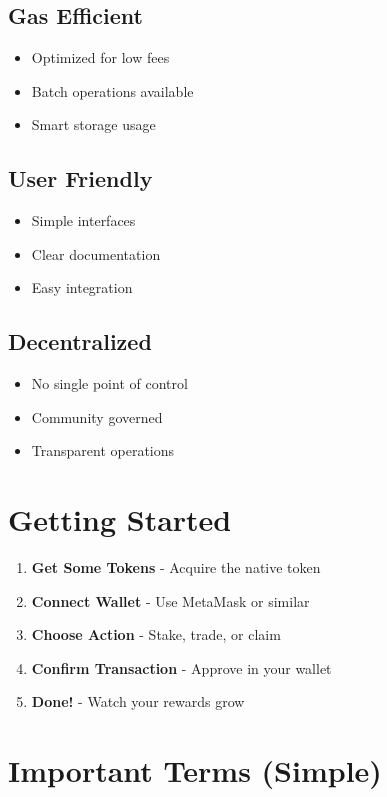 \documentclass[11pt,a4paper]{article}
\begin{document}
\subsection{Gas Efficient}
\begin{itemize}
\item Optimized for low fees
\item Batch operations available
\item Smart storage usage
\end{itemize}

\subsection{User Friendly}
\begin{itemize}
\item Simple interfaces
\item Clear documentation
\item Easy integration
\end{itemize}

\subsection{Decentralized}
\begin{itemize}
\item No single point of control
\item Community governed
\item Transparent operations
\end{itemize}

\section{Getting Started}

\begin{enumerate}
\item \textbf{Get Some Tokens} - Acquire the native token
\item \textbf{Connect Wallet} - Use MetaMask or similar
\item \textbf{Choose Action} - Stake, trade, or claim
\item \textbf{Confirm Transaction} - Approve in your wallet
\item \textbf{Done!} - Watch your rewards grow
\end{enumerate}

\section{Important Terms (Simple)}
\end{document}
